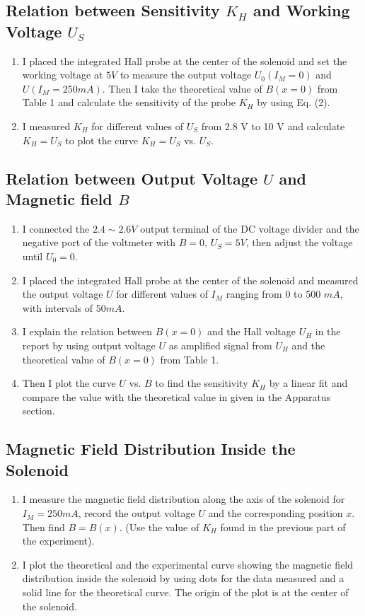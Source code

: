 \documentclass[12pt]{article}
\begin{document}
\subsection{Relation between Sensitivity $K_H$ and Working Voltage $U_S$}
\begin{enumerate}
\item I placed the integrated Hall probe at the center of the solenoid and set the working voltage at $5V$ to measure the output voltage $U_0(I_M=0)$ and $U(I_M=250mA)$. Then I take the theoretical value of $B(x = 0)$ from Table 1 and calculate the sensitivity of the probe $K_H$ by using Eq. (2).
\item I measured $K_H$ for different values of $U_S$ from 2.8 V to 10 V and calculate $K_H=U_S$ to plot the curve $K_H=U_S$ vs. $U_S$.
\end{enumerate}
\subsection{Relation between Output Voltage $U$ and Magnetic field $B$}
\begin{enumerate}
\item I connected the $2.4\sim2.6V$ output terminal of the DC voltage
divider and the negative port of the voltmeter with $B=0$, $U_S=5V$, then adjust the voltage until $U_0=0$.
\item I placed the integrated Hall probe at the center of the solenoid and measured the output
voltage $U$ for different values of $I_M$ ranging from 0 to 500 $mA$, with intervals of $50
mA$.
\item I explain the relation between $B(x=0)$ and the Hall voltage $U_H$ in the report by using output voltage $U$ as amplified signal from $U_H$ and the theoretical
value of $B(x = 0)$ from Table 1.
\item Then I plot the curve $U$ vs. $B$ to find the sensitivity $K_H$ by a linear fit and compare the value  with the theoretical value in given in the Apparatus
section.
\end{enumerate}
\subsection{Magnetic Field Distribution Inside the Solenoid}
\begin{enumerate}
\item I measure the magnetic field distribution along the axis of the solenoid for $I_M=250
mA$, record the output voltage $U$ and the corresponding position $x$. Then find $B = B(x)$. (Use the value of $K_H$ found in the previous part of the experiment).
\item I plot the theoretical and the experimental curve showing the
magnetic field distribution inside the solenoid by using dots for the data measured and
a solid line for the theoretical curve. The origin of the plot is at the center
of the solenoid.
\end{enumerate}
\end{document}
